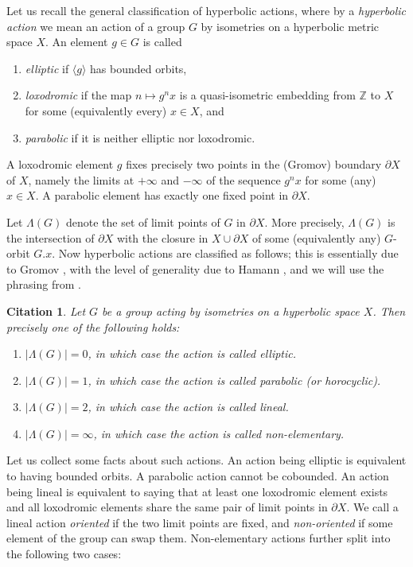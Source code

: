 \documentclass[reqno,12pt]{amsart}\setcounter{tocdepth}{1}
\newtheorem{cit}[theorem]{Citation}
\theoremstyle{definition}
\newcommand{\Z}{\mathbb{Z}}
\numberwithin{equation}{section}
\begin{document}
Let us recall the general classification of hyperbolic actions, where by a \emph{hyperbolic action} we mean an action of a group $G$ by isometries on a hyperbolic metric space $X$. An element $g\in G$ is called \begin{enumerate}
    \item \emph{elliptic} if $\langle g\rangle$ has bounded orbits, \item \emph{loxodromic} if the map $n\mapsto g^n x$ is a quasi-isometric embedding from $\Z$ to $X$ for some (equivalently every) $x\in X$, and 
    \item \emph{parabolic} if it is neither elliptic nor loxodromic. 
    \end{enumerate}
    A loxodromic element $g$ fixes precisely two points in the (Gromov) boundary $\partial X$ of $X$, namely the limits at $+\infty$ and $-\infty$ of the sequence $g^n x$ for some (any) $x\in X$. A parabolic element has exactly one fixed point in $\partial X$. 

Let $\Lambda(G)$ denote the set of limit points of $G$ in $\partial X$. More precisely, $\Lambda(G)$ is the intersection of $\partial X$ with the closure in $X\cup\partial X$ of some (equivalently any) $G$-orbit $G.x$. Now hyperbolic actions are classified as follows; this is essentially due to Gromov \cite[Section~8.2]{gromov87}, with the level of generality due to Hamann \cite{hamann17}, and we will use the phrasing from \cite[Theorem~2.7]{confining}.

\begin{cit}
Let $G$ be a group acting by isometries on a hyperbolic space $X$. Then precisely one of the following holds:
\begin{enumerate}
    \item $|\Lambda(G)|=0$, in which case the action is called \emph{elliptic}.
    \item $|\Lambda(G)|=1$, in which case the action is called \emph{parabolic} (or \emph{horocyclic}).
    \item $|\Lambda(G)|=2$, in which case the action is called \emph{lineal}.
    \item $|\Lambda(G)|=\infty$, in which case the action is called \emph{non-elementary}.
\end{enumerate}
\end{cit}

Let us collect some facts about such actions. An action being elliptic is equivalent to having bounded orbits. A parabolic action cannot be cobounded. An action being lineal is equivalent to saying that at least one loxodromic element exists and all loxodromic elements share the same pair of limit points in $\partial X$. We call a lineal action \emph{oriented} if the two limit points are fixed, and \emph{non-oriented} if some element of the group can swap them. Non-elementary actions further split into the following two cases:
\end{document}

